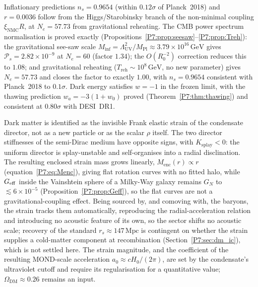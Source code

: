 \documentclass[11pt,a4paper]{article}
\theoremstyle{definition}
\theoremstyle{remark}
\newcommand{\MPl}{M_{\mathrm{Pl}}}
\newcommand{\LUV}{\Lambda_{\mathrm{UV}}}
\newcommand{\xNMC}{\xi_{\mathrm{NMC}}}
\begin{document}
Inflationary predictions $n_s=0.9654$ (within $0.12\sigma$ of Planck~2018)
and $r=0.0036$ follow from the Higgs/Starobinsky branch of the
non-minimal coupling $\xNMC R$, at $N_e=57.73$ from gravitational reheating.  The CMB power spectrum normalisation
is proved exactly (Propositions~\ref{P7:prop:seesaw}--\ref{P7:prop:Treh}):
the gravitational see-saw scale $M_{\mathrm{inf}}=\LUV^2/\MPl
\approx3.79\times10^{16}\,\mathrm{GeV}$ gives $\mathcal{P}_s=2.82\times10^{-9}$
at $N_e=60$ (factor $1.34$); the $O(R_0^{-2})$ correction reduces this to $1.08$;
and gravitational reheating ($T_{\mathrm{reh}}\sim10^8\,\mathrm{GeV}$,
no new parameter) gives $N_e=57.73$ and closes the factor to exactly $1.00$,
with $n_s=0.9654$ consistent with Planck~2018 to $0.1\sigma$.
Dark energy satisfies $w=-1$ in
the frozen limit, with the thawing prediction $w_a=-3(1+w_0)$
proved (Theorem~\ref{P7:thm:thawing}) and consistent at $0.80\sigma$ with DESI~DR1.

Dark matter is identified as the invisible Frank elastic strain of the
condensate director, not as a new particle or as the scalar $\rho$
itself.  The two director stiffnesses of the semi-Dirac medium have
opposite signs, with $K_{\mathrm{splay}}<0$: the uniform director is
splay-unstable and self-organises into a radial disclination.  The
resulting enclosed strain mass grows linearly, $M_{\mathrm{enc}}(r)
\propto r$ (equation~\eqref{P7:eq:Menc}), giving flat rotation curves
with no fitted halo, while $G_{\rm eff}$ inside the Vainshtein sphere of
a Milky-Way galaxy remains $G_N$ to $\lesssim6\times10^{-5}$
(Proposition~\ref{P7:prop:Geff}), so the flat curves are not a
gravitational-coupling effect.  Being sourced by, and comoving with,
the baryons, the strain tracks them automatically, reproducing the
radial-acceleration relation and introducing no acoustic feature of its
own, so the sector shifts no acoustic scale; recovery
of the standard $r_s\approx147\,\mathrm{Mpc}$ is contingent on whether the
strain supplies a cold-matter component at recombination
(Section~\ref{P7:sec:dm_ic}), which is not settled here.
The strain magnitude, and the coefficient of the resulting MOND-scale
acceleration $a_0\approx cH_0/(2\pi)$, are set by the condensate's
ultraviolet cutoff and require its regularisation for a quantitative
value; $\Omega_{\mathrm{DM}}\approx0.26$ remains an input.
\end{document}
